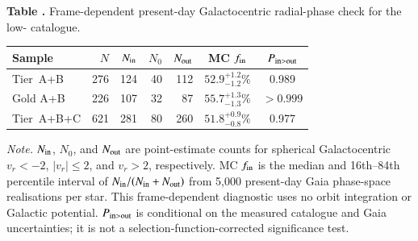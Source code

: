 \begin{center}
\label{tab:radial_phase}
\begin{minipage}{\columnwidth}
\small\textbf{Table \thetable.} Frame-dependent present-day Galactocentric radial-phase check for the low-\vgrf{} catalogue.
\end{minipage}
\vspace{0.4ex}

\scriptsize
\setlength{\tabcolsep}{2.4pt}
\begin{tabular}{lrrrrcc}
\hline\hline
Sample & $N$ & $N_{\rm in}$ & $N_{0}$ & $N_{\rm out}$ & MC $f_{\rm in}$ & $P_{\rm in>out}$ \\
\hline
Tier~A+B & 276 & 124 & 40 & 112 & $52.9^{+1.2}_{-1.2}\%$ & 0.989 \\
Gold A+B & 226 & 107 & 32 & 87 & $55.7^{+1.3}_{-1.3}\%$ & $>0.999$ \\
Tier~A+B+C & 621 & 281 & 80 & 260 & $51.8^{+0.9}_{-0.8}\%$ & 0.977 \\
\hline
\end{tabular}
\vspace{0.5ex}

\begin{minipage}{0.95\columnwidth}
\footnotesize
\textit{Note.} $N_{\rm in}$, $N_0$, and $N_{\rm out}$ are point-estimate counts for spherical Galactocentric $v_r < -2$\kms, $|v_r|\leq 2$\kms, and $v_r>2$\kms, respectively.  MC $f_{\rm in}$ is the median and 16th--84th percentile interval of $N_{\rm in}/(N_{\rm in}+N_{\rm out})$ from 5{,}000 present-day Gaia phase-space realisations per star.  This frame-dependent diagnostic uses no orbit integration or Galactic potential.  $P_{\rm in>out}$ is conditional on the measured catalogue and Gaia uncertainties; it is not a selection-function-corrected significance test.
\end{minipage}
\end{center}
